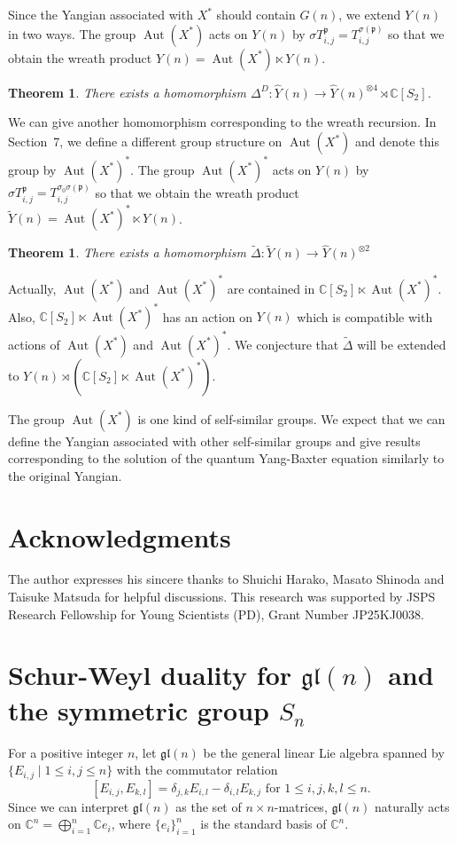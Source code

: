 \documentclass{article}
\newtheorem{Theorem}[equation]{Theorem}
\theoremstyle{definition}
\theoremstyle{remark}
\numberwithin{equation}{section}
\DeclareMathOperator{\Aut}{Aut}
\numberwithin{equation}{section}
\begin{document}
Since the Yangian associated with $X^*$ should contain $G(n)$, we extend $Y(n)$ in two ways. The group $\Aut(X^*)$ acts on $Y(n)$ by $\sigma T^{\mathfrak{p}}_{i,j}=T^{\sigma(\mathfrak{p})}_{i,j}$ so that we obtain the wreath product $\widehat{Y}(n)=\Aut(X^*)\ltimes Y(n)$.
\begin{Theorem}
There exists a homomorphism $\Delta^D\colon \widehat{Y}(n)\to\widehat{Y}(n)^{\otimes 4}\rtimes\mathbb{C}[S_2]$.
\end{Theorem}
We can give another homomorphism corresponding to the wreath recursion.
In Section~7, we define a different group structure on $\Aut(X^*)$ and denote this group by $\Aut(X^*)^*$. The group $\Aut(X^*)^*$ acts on $Y(n)$ by $\sigma T^{\mathfrak{p}}_{i,j}=T^{\sigma_0\sigma(\mathfrak{p})}_{i,j}$ so that we obtain the wreath product $\widetilde{Y}(n)=\Aut(X^*)^*\ltimes Y(n)$.
\begin{Theorem}
There exists a homomorphism $\widetilde{\Delta}\colon \widetilde{Y}(n)\to\widehat{Y}(n)^{\otimes 2}$
\end{Theorem}
Actually, $\Aut(X^*)$ and $\Aut(X^*)^\ast$ are contained in $\mathbb{C}[S_2]\ltimes\Aut(X^*)^*$. Also, $\mathbb{C}[S_2]\ltimes\Aut(X^*)^*$ has an action on $Y(n)$ which is compatible with actions of $\Aut(X^*)$ and $\Aut(X^*)^\ast$. We conjecture that $\widetilde{\Delta}$ will be extended to $Y(n)\rtimes(\mathbb{C}[S_2]\ltimes\Aut(X^*)^*)$.

The group $\Aut(X^*)$ is one kind of self-similar groups. We expect that we can define the Yangian associated with other self-similar groups and give results corresponding to the solution of the quantum Yang-Baxter equation similarly to the original Yangian.

\section*{Acknowledgments}
The author expresses his sincere thanks to Shuichi Harako, Masato Shinoda and Taisuke Matsuda for helpful discussions. This research was supported by JSPS Research Fellowship for Young Scientists (PD), Grant Number JP25KJ0038.

\section{Schur-Weyl duality for $\mathfrak{gl}(n)$ and the symmetric group $S_n$}
For a positive integer $n$, let $\mathfrak{gl}(n)$ be the general linear Lie algebra spanned by $\{E_{i,j}\mid 1\leq i,j\leq n\}$ with the commutator relation
\[
[E_{i,j},E_{k,l}]=\delta_{j,k}E_{i,l}-\delta_{i,l}E_{k,j}\text{ for }1\leq i,j,k,l\leq n.
\]
Since we can interpret $\mathfrak{gl}(n)$ as the set of $n\times n$-matrices, $\mathfrak{gl}(n)$ naturally acts on $\mathbb{C}^n=\bigoplus_{i=1}^n\mathbb{C}e_i$, where $\{e_i\}_{i=1}^n$ is the standard basis of $\mathbb{C}^n$.
\end{document}

